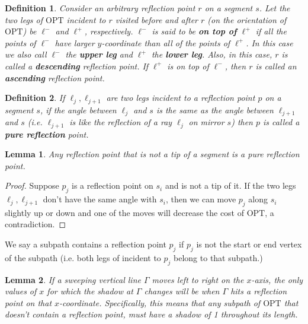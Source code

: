 \documentclass[pdflatex,sn-mathphys-num]{sn-jnl}
\theoremstyle{thmstyleone}
\newtheorem{lemma}{Lemma}
\newtheorem{definition}{Definition} %
\newcommand{\OPT}{{\text{OPT}}}
\begin{document}
\begin{definition}\label{def:ascending}
    Consider an arbitrary reflection point $r$ on a segment $s$. Let the two legs of $\OPT$ incident to $r$ visited before and after $r$ (on the orientation of $\OPT$) be $ \ell^- $ and $ \ell^+ $, respectively.
    $\ell^-$ is said to be \textbf{on top of} $\ell^+$  if all the points of $\ell^-$ have larger $y$-coordinate than all of the points of $\ell^+$. 
    In this case we also call $\ell^-$ the \textbf{upper leg} and $\ell^+$ the \textbf{lower leg}.
    Also, in this case, $r$ is called a \textbf{descending} reflection point.
    If $\ell^+ $ is on top of $\ell^- $, then $r$ is called an \textbf{ascending} reflection point.
\end{definition}

\begin{definition}
    If $\ell_j,\ell_{j+1}$ are two legs incident to a reflection point $p$ on a segment $s$, if 
    the angle between $\ell_j$ and $s$ is the same as the angle between $\ell_{j+1}$ and $s$ (i.e. $\ell_{j+1}$ is like the reflection of a ray $\ell_j$ on mirror $s$) then $p$ is called a \textbf{pure reflection} point.
\end{definition}

\begin{lemma}\label{obs:break-on-tip}
    Any reflection point that is not a tip of a segment is a pure reflection point.
\end{lemma}

\begin{proof}
    Suppose $p_j$ is a reflection point on $s_i$ and is not a tip of it. If the two legs $\ell_j,\ell_{j+1}$ don't have the same angle with $s_i$, then we
    can move $p_j$ along $s_i$ slightly up or down and one of the moves will decrease the cost of $\OPT$, a contradiction.
\end{proof}

We say a subpath contains a reflection point $p_j$ if $p_j$ is not the start or end vertex of the subpath (i.e. both legs of incident to $p_j$ belong to that subpath.)

\begin{lemma}\label{obs:shadow-increase}
    If a sweeping vertical line $\Gamma$ moves left to right on the $ x $-axis, the only values of $x$ for which the shadow at $\Gamma$ changes will be when $\Gamma$ hits a reflection point on that $x$-coordinate. Specifically, this means that any subpath of $\OPT$ that doesn't contain a reflection point, must have a shadow of 1 throughout its length. 
\end{lemma}
\end{document}
